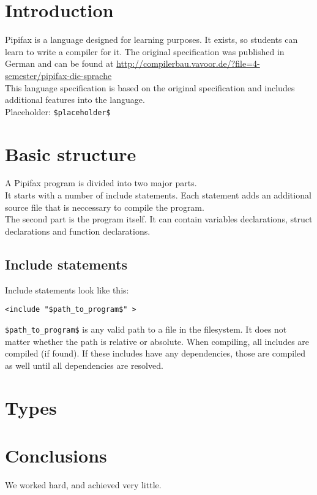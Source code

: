 \documentclass[a4paper, 12pt, english]{article}
\begin{document}
\maketitle
\thispagestyle{empty}
\newpage

\tableofcontents
\pagebreak


\section{Introduction}
Pipifax is a language designed for learning purposes. It exists, so students can learn to write a compiler for it. The original specification was published in German and can be found at \url{http://compilerbau.vavoor.de/?file=4-semester/pipifax-die-sprache} \\
This language specification is based on the original specification and includes additional features into the language.\\

Placeholder: \verb|$placeholder$|
\section{Basic structure}\label{basic structure}
A Pipifax program is divided into two major parts.\\
It starts with a number of include statements. Each statement adds an additional source file that is neccessary to compile the program.\\
The second part is the program itself. It can contain variables declarations, struct declarations and function declarations.

\subsection{Include statements}
Include statements look like this:
\begin{lstlisting}
<include "$path_to_program$" >
\end{lstlisting}
\verb|$path_to_program$| is any valid path to a file in the filesystem. It does not matter whether the path is relative or absolute.
When compiling, all includes are compiled (if found). If these includes have any dependencies, those are compiled as well until all dependencies are resolved.
\section{Types}\label{types}


\section{Conclusions}\label{conclusions}
We worked hard, and achieved very little.



\end{document}
